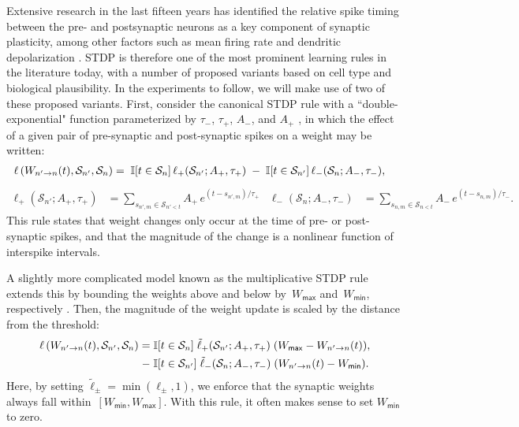 Extensive research in the last fifteen years has identified the relative spike timing between the pre- and postsynaptic neurons as a key component of synaptic plasticity, among other factors such as mean firing rate and dendritic depolarization \cite{Feldman-2012}. STDP is therefore one of the most prominent learning rules in the literature today, with a number of proposed variants based on cell type and biological plausibility. In the experiments to follow, we will make use of two of these proposed variants. First, consider the canonical STDP rule with a ``double-exponential" function parameterized by $\tau_-$, $\tau_+$, $A_-$, and $A_+$ \cite{Song-2000}, in which the effect of a given pair of pre-synaptic and post-synaptic spikes on a weight may be written:
\begin{align}
\label{eqn:AddSTDP}
 \ell\left(W_{n' \to n}(t), \mathcal{S}_{n'}, \mathcal{S}_{n} \right) &= 
 \;\mathbb{I}[t \in \mathcal{S}_{n}]\, \ell_+(\mathcal{S}_{n'}; A_+, \tau_+) 
 \;-\;\mathbb{I}[t \in \mathcal{S}_{n'}]\, \ell_-(\mathcal{S}_{n}; A_-, \tau_-),
\end{align}
\begin{align*}
\ell_+(\mathcal{S}_{n'}; A_+, \tau_+) &= \sum_{s_{n',m}\in \mathcal{S}_{n'<t}}  A_+\,e^{(t-s_{n',m})/ \tau_+} &
\ell_-(\mathcal{S}_{n}; A_-, \tau_-) &= \sum_{s_{n,m}\in \mathcal{S}_{n<t}} A_-\,e^{(t-s_{n,m})/\tau_-}.
\end{align*}
This rule states that weight changes only occur at the time of pre- or post-synaptic spikes, and that the magnitude of the change is a nonlinear function of interspike intervals.  %

A slightly more complicated model known as the multiplicative STDP rule extends this by bounding the weights above and below by~$W_{\mathsf{max}}$ and~$W_{\mathsf{min}}$, respectively \cite{Morrison-2008}. Then, the magnitude of the weight update is scaled by the distance from the threshold:
\begin{align}
 \label{eqn:MultSTDP}
 \ell\left(W_{n' \to n}(t), \mathcal{S}_{n'}, \mathcal{S}_{n} \right) = 
 \;&\mathbb{I}[t \in \mathcal{S}_{n}]\;  \tilde\ell_+(\mathcal{S}_{n'}; A_+, \tau_+) \;(W_{\mathsf{max}}-W_{n'\to n}(t)), \nonumber \\
  \;-\; &\mathbb{I}[t \in \mathcal{S}_{n'}]\;  \tilde\ell_-(\mathcal{S}_{n}; A_-, \tau_-)\;(W_{n'\to n}(t)-W_{\mathsf{min}}).
\end{align}
Here, by setting ${\tilde\ell_\pm = \min(\ell_\pm,1)}$, we enforce that the synaptic weights always fall within~${[W_{\mathsf{min}}, W_{\mathsf{max}}]}$. With this rule, it often makes sense to set $W_{\mathsf{min}}$ to zero.

